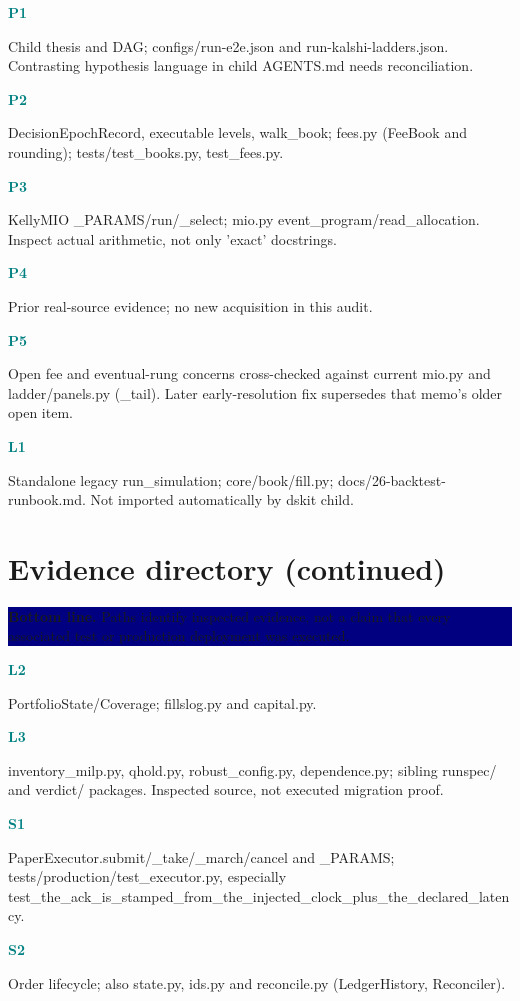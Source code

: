 \documentclass[10pt,letterpaper]{article}
\newcommand{\bl}[1]{\noindent\colorbox{navy}{\parbox{\dimexpr\linewidth-2\fboxsep}{\color{white}\textbf{Bottom line.} #1}}\par\medskip}
\newcommand{\topic}[2]{\clearpage\section{#1}\bl{#2}}
\newcommand{\sub}[1]{\par\textbf{\textcolor{teal}{#1}}\par}
\begin{document}
\sub{P1}
{\small{}}\par
Child thesis and DAG; configs/run-e2e.json and run-kalshi-ladders.json. Contrasting hypothesis language in child AGENTS.md needs reconciliation.
\sub{P2}
{\small{}}\par
DecisionEpochRecord, executable levels, walk\_book; fees.py (FeeBook and rounding); tests/test\_books.py, test\_fees.py.
\sub{P3}
{\small{}}\par
KellyMIO \_PARAMS/run/\_select; mio.py event\_program/read\_allocation. Inspect actual arithmetic, not only 'exact' docstrings.
\sub{P4}
{\small{}}\par
Prior real-source evidence; no new acquisition in this audit.
\sub{P5}
{\small{}}\par
Open fee and eventual-rung concerns cross-checked against current mio.py and ladder/panels.py (\_tail). Later early-resolution fix supersedes that memo's older open item.
\sub{L1}
{\small{}}\par
Standalone legacy run\_simulation; core/book/fill.py; docs/26-backtest-runbook.md. Not imported automatically by dskit child.
\topic{Evidence directory (continued)}{Paths identify inspected evidence, not a claim that every associated test or production deployment was executed.}
\sub{L2}
{\small{}}\par
PortfolioState/Coverage; fillslog.py and capital.py.
\sub{L3}
{\small{}}\par
inventory\_milp.py, qhold.py, robust\_config.py, dependence.py; sibling runspec/ and verdict/ packages. Inspected source, not executed migration proof.
\sub{S1}
{\small{}}\par
PaperExecutor.submit/\_take/\_march/cancel and \_PARAMS; tests/production/test\_executor.py, especially test\_the\_ack\_is\_stamped\_from\_the\_injected\_clock\_plus\_the\_declared\_latency.
\sub{S2}
{\small{}}\par
Order lifecycle; also state.py, ids.py and reconcile.py (LedgerHistory, Reconciler).
\end{document}
